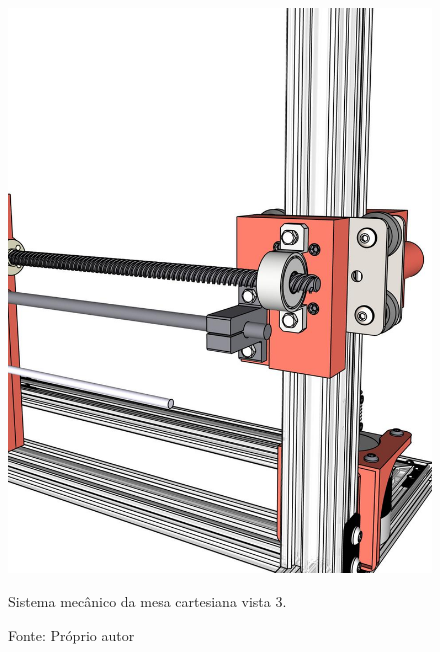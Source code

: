 \begin{figure}[H]
\centering
\includegraphics[scale = 0.45]{figuras/mesacartesiana03}
\caption{Sistema mecânico da mesa cartesiana vista 3.}
\caption*{Fonte: Próprio autor}
\label{fig:mesacartesiana03}
\end{figure}

